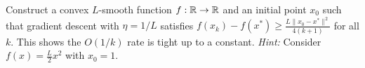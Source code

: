 \documentclass[11pt,a4paper]{article}
\begin{document}
\begin{exercise}\label{ex:lower-bound}
Construct a convex $L$-smooth function $f : \mathbb{R} \to \mathbb{R}$ and an initial
point $x_0$ such that gradient descent with $\eta = 1/L$ satisfies
$f(x_k) - f(x^*) \ge \frac{L\|x_0 - x^*\|^2}{4(k+1)}$ for all $k$.
This shows the $O(1/k)$ rate is tight up to a constant.
\emph{Hint:} Consider $f(x) = \frac{L}{2}x^2$ with $x_0 = 1$.
\end{exercise}


\end{document}

